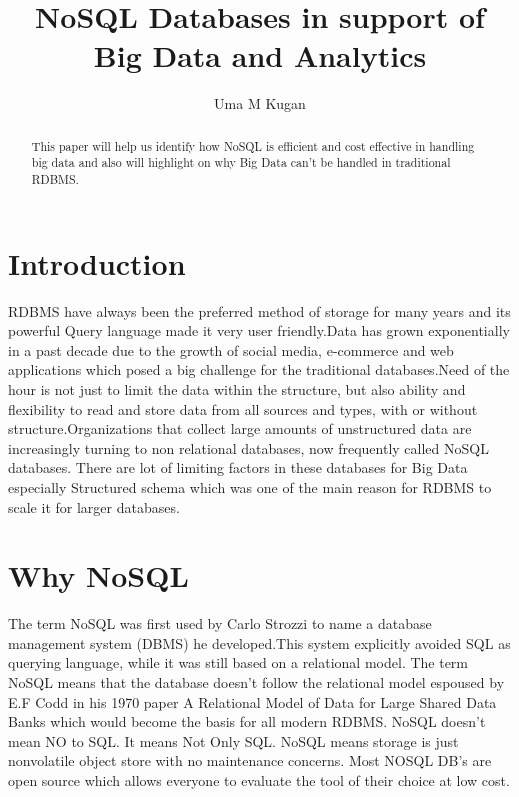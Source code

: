 \documentclass[sigconf]{acmart}
\begin{document}
\title{NoSQL Databases in support of Big Data and Analytics}


\author{Uma M Kugan}

\renewcommand{\shortauthors}{Uma}


\begin{abstract}
This paper will help us identify how NoSQL is efficient and cost effective in handling big data and also will highlight on why Big Data can't be handled in traditional RDBMS.
\end{abstract}



\maketitle

\section{Introduction}

RDBMS have always been the preferred method of storage for many years and its powerful Query language made it very user friendly.Data has grown exponentially in a past decade due to the growth of social media, e-commerce and web applications which posed a big challenge for the traditional databases.Need of the hour is not just to limit the data within the structure, but also ability and flexibility to read and store data from all sources and types, with or without structure.Organizations that collect large amounts of unstructured data are increasingly turning to non relational databases, now frequently called NoSQL databases.\cite{neal} There are lot of limiting factors in these databases for Big Data especially Structured schema which was one of the main reason for RDBMS to scale it for larger databases\cite{aspirenosql}.

\section{Why NoSQL}
The term NoSQL was first used by Carlo Strozzi to name a database management system (DBMS) he developed.This system explicitly avoided SQL as querying language, while it was still based on a relational model\cite{seasupenn}. The term NoSQL means that the database doesn't follow the relational model espoused by E.F Codd in his 1970 paper A Relational Model of Data for Large Shared Data Banks\cite{rdbms} which would become the basis for all modern RDBMS.  NoSQL doesn't mean NO to SQL. It means Not Only SQL. NoSQL means storage is just nonvolatile object store with no maintenance concerns. Most NOSQL DB's are open source which allows everyone to evaluate the tool of their choice at low cost.
\end{document}
